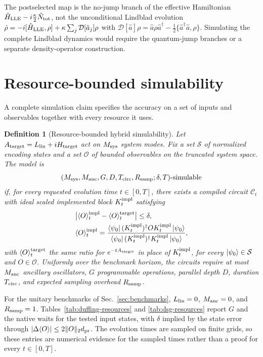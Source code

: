 \documentclass[pra,twocolumn,superscriptaddress,nofootinbib,floatfix]{revtex4-2}
\newtheorem{definition}{Definition}
\theoremstyle{remark}
\newcommand{\dpr}{d_{\rm pr}}
\begin{document}
The postselected map is the no-jump branch of the effective Hamiltonian \(\hat H_{\rm LLE}-i\tfrac{\kappa}{2}\hat N_{\rm tot}\), not the unconditional Lindblad evolution \(\dot\rho=-i[\hat H_{\rm LLE},\rho]+\kappa\sum_j\mathcal D[\hat a_j]\rho\) with \(\mathcal D[\hat a]\rho=\hat a\rho\hat a^\dagger-\tfrac12\{\hat a^\dagger\hat a,\rho\}\). Simulating the complete Lindblad dynamics would require the quantum-jump branches or a separate density-operator construction.

\section{Resource-bounded simulability}
\label{app:simulability}

A complete simulation claim specifies the accuracy on a set of inputs and observables together with every resource it uses.

\begin{definition}[Resource-bounded hybrid simulability]
\label{def:simulability}
Let \(A_{\rm target}=L_{\rm lin}+iH_{\rm target}\) act on \(M_{\rm sys}\) system modes. Fix a set \(\mathcal S\) of normalized encoding states and a set \(\mathcal O\) of bounded observables on the truncated system space. The model is
\[
(M_{\rm sys},M_{\rm anc},G,D,T_{\rm circ},R_{\rm samp};\delta,T)\text{-simulable}
\]
if, for every requested evolution time \(t\in[0,T]\), there exists a compiled circuit \(\mathcal C_t\) with ideal scaled implemented block \(K_t^{\rm impl}\) satisfying
\begin{align}
&\bigl|\langle O\rangle_t^{\rm impl}-\langle O\rangle_t^{\rm target}\bigr|\leq\delta,\nonumber\\
&\langle O\rangle_t^{\rm impl}=\frac{\bra{\psi_0}(K_t^{\rm impl})^\dagger O K_t^{\rm impl}\ket{\psi_0}}{\bra{\psi_0}(K_t^{\rm impl})^\dagger K_t^{\rm impl}\ket{\psi_0}},
\end{align}
with \(\langle O\rangle_t^{\rm target}\) the same ratio for \(e^{-tA_{\rm target}}\) in place of \(K_t^{\rm impl}\), for every \(\ket{\psi_0}\in\mathcal S\) and \(O\in\mathcal O\). Uniformly over the benchmark horizon, the circuits require at most \(M_{\rm anc}\) ancillary oscillators, \(G\) programmable operations, parallel depth \(D\), duration \(T_{\rm circ}\), and expected sampling overhead \(R_{\rm samp}\).
\end{definition}

For the unitary benchmarks of Sec.~\ref{sec:benchmarks}, \(L_{\rm lin}=0\), \(M_{\rm anc}=0\), and \(R_{\rm samp}=1\). Tables~\ref{tab:duffing-resources} and \ref{tab:dsg-resources} report \(G\) and the native waits for the tested input states, with \(\delta\) implied by the state error through \(|\Delta\langle O\rangle|\le2\|O\|_2\dpr\). The evolution times are sampled on finite grids, so these entries are numerical evidence for the sampled times rather than a proof for every \(t\in[0,T]\).
\end{document}
